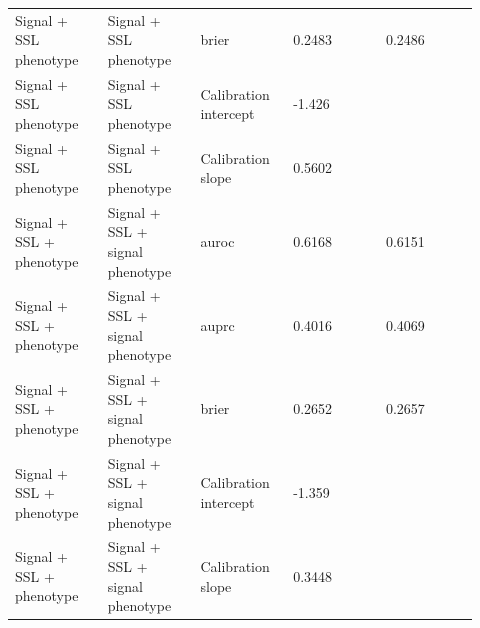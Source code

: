 \documentclass[11pt]{article}
\begin{document}
\begin{landscape}
\begin{longtable}{L{0.184\linewidth} L{0.184\linewidth} L{0.184\linewidth} L{0.184\linewidth} L{0.184\linewidth}}
Signal + SSL phenotype & Signal + SSL phenotype & brier & 0.\allowbreak{}2483 & 0.\allowbreak{}2486 \\
Signal + SSL phenotype & Signal + SSL phenotype & Calibration intercept & -\allowbreak{}1.\allowbreak{}426 &  \\
Signal + SSL phenotype & Signal + SSL phenotype & Calibration slope & 0.\allowbreak{}5602 &  \\
Signal + SSL + phenotype & Signal + SSL + signal phenotype & auroc & 0.\allowbreak{}6168 & 0.\allowbreak{}6151 \\
Signal + SSL + phenotype & Signal + SSL + signal phenotype & auprc & 0.\allowbreak{}4016 & 0.\allowbreak{}4069 \\
Signal + SSL + phenotype & Signal + SSL + signal phenotype & brier & 0.\allowbreak{}2652 & 0.\allowbreak{}2657 \\
Signal + SSL + phenotype & Signal + SSL + signal phenotype & Calibration intercept & -\allowbreak{}1.\allowbreak{}359 &  \\
Signal + SSL + phenotype & Signal + SSL + signal phenotype & Calibration slope & 0.\allowbreak{}3448 &  \\
\end{longtable}
\normalsize
\end{landscape}
\end{document}
